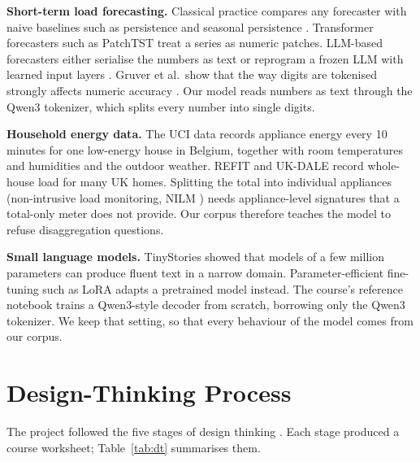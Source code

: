 \documentclass[conference]{IEEEtran}
\begin{document}
\textbf{Short-term load forecasting.} Classical practice compares any forecaster with naive baselines such as
persistence and seasonal persistence \cite{hyndman2021fpp3}. Transformer forecasters such as PatchTST
\cite{nie2023patchtst} treat a series as numeric patches. LLM-based forecasters either serialise the numbers as text
\cite{gruver2023llmtime} or reprogram a frozen LLM with learned input layers \cite{jin2024timellm}. Gruver et al.\
show that the way digits are tokenised strongly affects numeric accuracy \cite{gruver2023llmtime}. Our model reads
numbers as text through the Qwen3 tokenizer, which splits every number into single digits.

\textbf{Household energy data.} The UCI data \cite{candanedo2017} records appliance energy every 10 minutes for one
low-energy house in Belgium, together with room temperatures and humidities and the outdoor weather. REFIT
\cite{murray2017refit} and UK-DALE \cite{kelly2015ukdale} record whole-house load for many UK homes. Splitting the
total into individual appliances (non-intrusive load monitoring, NILM \cite{hart1992}) needs appliance-level
signatures that a total-only meter does not provide. Our corpus therefore teaches the model to refuse
disaggregation questions.

\textbf{Small language models.} TinyStories \cite{eldan2023tinystories} showed that models of a few million
parameters can produce fluent text in a narrow domain. Parameter-efficient fine-tuning such as LoRA
\cite{hu2022lora} adapts a pretrained model instead. The course's reference notebook trains a Qwen3-style decoder from
scratch, borrowing only the Qwen3 tokenizer. We keep that setting, so that every behaviour of the model comes from
our corpus.

\section{Design-Thinking Process}

The project followed the five stages of design thinking \cite{brown2008design}. Each stage produced a course
worksheet; Table~\ref{tab:dt} summarises them.
\end{document}
